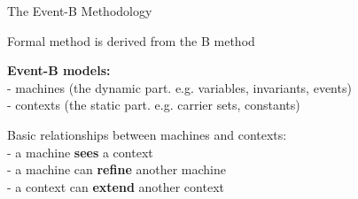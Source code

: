 \documentclass{beamer}
\begin{document}
  \begin{frame}{The Event-B Methodology}

    Formal method is derived from the B method

    \textbf{Event-B models:}\\
    - machines (the dynamic part. e.g. variables, invariants, events)\\
    - contexts (the static part. e.g. carrier sets, constants)

    Basic relationships between machines and contexts:\\
    - a machine \textbf{sees} a context\\
    - a machine can \textbf{refine} another machine\\
    - a context can \textbf{extend} another context

  \end{frame}
\end{document}
